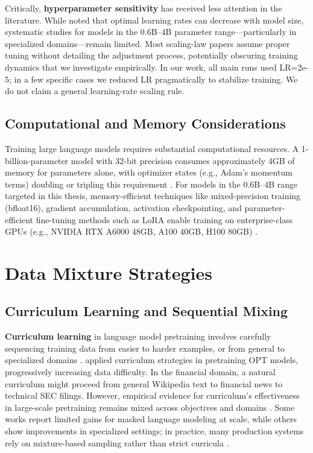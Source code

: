 Critically, \textbf{hyperparameter sensitivity} has received less attention in the literature. While \textcite{mccandlish2018empirical} noted that optimal learning rates can decrease with model size, systematic studies for models in the 0.6B–4B parameter range—particularly in specialized domains—remain limited. Most scaling-law papers assume proper tuning without detailing the adjustment process, potentially obscuring training dynamics that we investigate empirically. In our work, all main runs used LR=2e-5; in a few specific cases we reduced LR pragmatically to stabilize training. We do not claim a general learning-rate scaling rule.

\subsection{Computational and Memory Considerations}

Training large language models requires substantial computational resources. A 1-billion-parameter model with 32-bit precision consumes approximately 4GB of memory for parameters alone, with optimizer states (e.g., Adam's momentum terms) doubling or tripling this requirement \parencite{rajbhandari2020zero,kingma2014adam}. For models in the 0.6B–4B range targeted in this thesis, memory-efficient techniques like mixed-precision training (bfloat16), gradient accumulation, activation checkpointing, and parameter-efficient fine-tuning methods such as LoRA enable training on enterprise-class GPUs (e.g., NVIDIA RTX A6000 48GB, A100 40GB, H100 80GB) \parencite{narayanan2021efficient,hu2021lora}.

\section{Data Mixture Strategies}

\subsection{Curriculum Learning and Sequential Mixing}

\textbf{Curriculum learning} in language model pretraining involves carefully sequencing training data from easier to harder examples, or from general to specialized domains \parencite{bengio2009curriculum}. \textcite{wu2022opt} applied curriculum strategies in pretraining OPT models, progressively increasing data difficulty. In the financial domain, a natural curriculum might proceed from general Wikipedia text to financial news to technical SEC filings. However, empirical evidence for curriculum's effectiveness in large-scale pretraining remains mixed across objectives and domains \parencite{longpre2023pretrainer}. Some works report limited gains for masked language modeling at scale, while others show improvements in specialized settings; in practice, many production systems rely on mixture-based sampling rather than strict curricula \parencite{raffel2020exploring,wu2022opt}.


